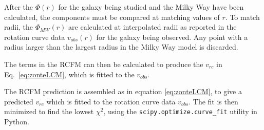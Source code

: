 \documentclass[reprint,%
 amsmath,amssymb,
 aps,
]{revtex4-1}
\begin{document}
After the $\Phi(r)$ for the galaxy being studied and the Milky Way have been calculated,   the components must be compared at  matching values of $r$. To match radii, the $\Phi_{MW}(r)$ are calculated at  interpolated   radii as reported in the 
rotation curve data $v_{obs}(r)$ for the galaxy being observed. Any point with a radius larger than the largest radius in the Milky Way model is discarded.

The terms in the RCFM   can then be calculated  to produce the  $v_{rc}$ in Eq.~\ref{eq:zonteLCM}, which is  fitted to the  $v_{obs}$. 

 








The RCFM prediction is    assembled as in equation \ref{eq:zonteLCM}, to give a predicted $v_{rc}$ which is fitted to the rotation curve data $v_{obs}$. The fit is then minimized to find the  lowest   $\chi^2$,  using the {\tt scipy.optimize.curve\_fit} utility in Python.
\end{document}
